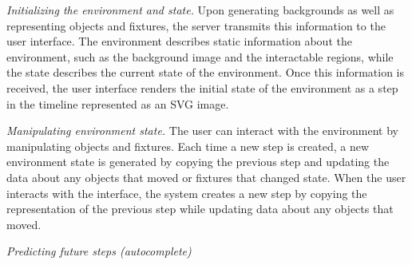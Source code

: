 \noindent \emph{Initializing the environment and state.} Upon generating backgrounds as well as representing objects and fixtures, the server transmits this information to the user interface. The environment describes static information about the environment, such as the background image and the interactable regions, while the state describes the current state of the environment. Once this information is received, the user interface renders the initial state of the environment as a step in the timeline represented as an SVG image.

\noindent \emph{Manipulating environment state.} The user can interact with the environment by manipulating objects and fixtures. Each time a new step is created, a new environment state is generated by copying the previous step and updating the data about any objects that moved or fixtures that changed state. When the user interacts with the interface, the system creates a new step by copying the representation of the previous step while updating data about any objects that moved. 


\noindent \emph{Predicting future steps (autocomplete)}









